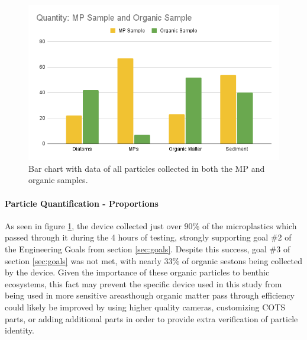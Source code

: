 \documentclass[fleqn,10pt]{SelfArx} %
\begin{document}
	\begin{figure}[h]
		\centering
		\includegraphics[width=1\linewidth]{Figures/MPOrganicCounting}
		\caption[Collected Particle Classification]{Bar chart with data of all particles collected in both the MP and organic samples.}
		\label{fig:mpcounting}
	\end{figure}
	\paragraph*{Particle Quantification - Proportions}
	As seen in figure \ref{fig:mpcounting}, the device collected just over 90\% of the microplastics which passed through it during the 4 hours of testing, strongly supporting goal \#2 of the Engineering Goals from section \ref{sec:goals}. Despite this success, goal \#3 of section \ref{sec:goals} was not met, with nearly 33\% of organic \glspl{seston} being collected by the device. Given the importance of these organic particles to \gls{benthic} ecosystems, this fact may prevent the specific device used in this study from being used in more sensitive areas\textemdash though organic matter pass through efficiency could likely be improved by using higher quality cameras, customizing COTS parts, or adding additional parts in order to provide extra verification of particle identity.
	
\end{document}

